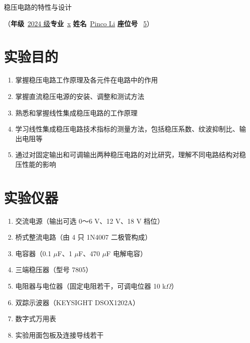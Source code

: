 ﻿\documentclass[12pt,a4paper]{article}
\begin{document}
\begin{center}
  {\heiti 稳压电路的特性与设计}
\end{center}
\vspace{0.1\baselineskip}
\begin{center}
  （\textbf{年级}\ \underline{2024 级}\quad \textbf{专业}\ \underline{x} \quad \textbf{姓名}\ \underline{Pinco Li} \quad \textbf{座位号} \ \underline{5}）
\end{center}
\vspace{0.1\baselineskip}

\section{实验目的}

\begin{enumerate}
  \item 掌握稳压电路工作原理及各元件在电路中的作用
  \item 掌握直流稳压电源的安装、调整和测试方法
  \item 熟悉和掌握线性集成稳压电路的工作原理
  \item 学习线性集成稳压电路技术指标的测量方法，包括稳压系数、纹波抑制比、输出电阻等
  \item 通过对固定输出和可调输出两种稳压电路的对比研究，理解不同电路结构对稳压性能的影响
\end{enumerate}

\section{实验仪器}

\begin{enumerate}
  \item 交流电源（输出可选 0～6 V、12 V、18 V 档位）
  \item 桥式整流电路（由 4 只 1N4007 二极管构成）
  \item 电容器（0.1 $\mu$F、1 $\mu$F、470 $\mu$F 电解电容）
  \item 三端稳压器（型号 7805）
  \item 电阻器与电位器（固定电阻若干，可调电位器 10 k$\Omega$）
  \item 双踪示波器（KEYSIGHT DSOX1202A）
  \item 数字式万用表
  \item 实验用面包板及连接导线若干
\end{enumerate}
\end{document}
